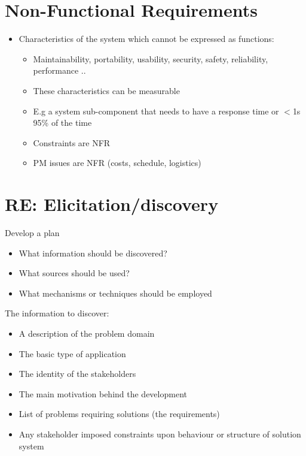 \documentclass{article}[18pt]
\begin{document}
\section{Non-Functional Requirements}
\begin{itemize}
	\item Characteristics of the system which cannot be expressed as functions:
	\begin{itemize}
		\item Maintainability, portability, usability, security, safety, reliability, performance ..
		\item These characteristics can be measurable
		\item E.g a system sub-component that needs to have a response time or $<$1s 95\% of the time
		\item Constraints are NFR
		\item PM issues are NFR (costs, schedule, logistics)
	\end{itemize}
\end{itemize}
\section{RE: Elicitation/discovery}
Develop a plan
\begin{itemize}
	\item What information should be discovered?
	\item What sources should be used?
	\item What mechanisms or techniques should be employed
\end{itemize}
The information to discover:
\begin{itemize}
	\item A description of the problem domain
	\item The basic type of application
	\item The identity of the stakeholders
	\item The main motivation behind the development
	\item List of problems requiring solutions (the requirements)
	\item Any stakeholder imposed constraints upon behaviour or structure of solution system
\end{itemize}
\end{document}
